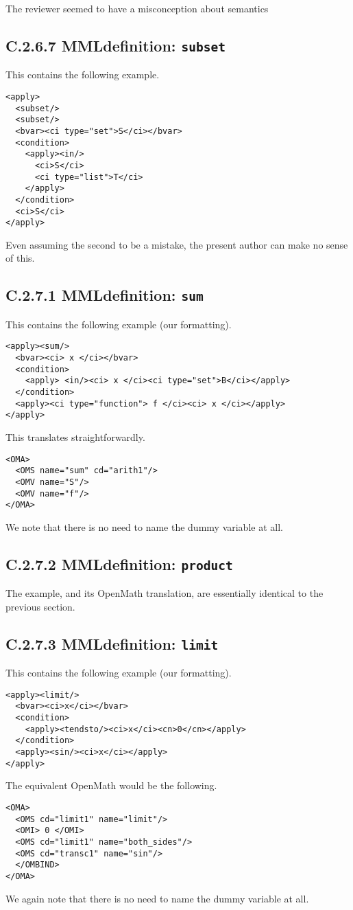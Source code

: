 \documentclass{llncs}
\begin{document}
\begin{newpart}{The reviewer seemed to have a misconception about semantics}
\subsection{C.2.6.7 MMLdefinition: {\tt subset}}\label{C267}
This contains the following example.
\begin{lstlisting}[language=MathML2]
<apply>
  <subset/>
  <subset/>
  <bvar><ci type="set">S</ci></bvar>
  <condition>
    <apply><in/>
      <ci>S</ci>
      <ci type="list">T</ci>
    </apply>
  </condition>
  <ci>S</ci>
</apply>
\end{lstlisting}
Even assuming the second {} to be a mistake, the present author
can make no sense of this.
\subsection{C.2.7.1 MMLdefinition: {\tt sum}}\label{C271}
This contains the following example (our formatting).
\begin{lstlisting}[language=MathML2]
<apply><sum/>
  <bvar><ci> x </ci></bvar>
  <condition>
    <apply> <in/><ci> x </ci><ci type="set">B</ci></apply>
  </condition>
  <apply><ci type="function"> f </ci><ci> x </ci></apply>
</apply>
\end{lstlisting}
This translates straightforwardly.
\begin{lstlisting}
<OMA>
  <OMS name="sum" cd="arith1"/>
  <OMV name="S"/>
  <OMV name="f"/>
</OMA>
\end{lstlisting}
We note that there is no need to name the dummy variable at all.
\subsection{C.2.7.2 MMLdefinition: {\tt product}}\label{C272}
The example, and its OpenMath translation, are essentially identical to the
previous section.
\subsection{C.2.7.3 MMLdefinition: {\tt limit}}\label{C273}
This contains the following example (our formatting).
\begin{lstlisting}[language=MathML2]
<apply><limit/>
  <bvar><ci>x</ci></bvar>
  <condition>
    <apply><tendsto/><ci>x</ci><cn>0</cn></apply>
  </condition>
  <apply><sin/><ci>x</ci></apply>
</apply>
\end{lstlisting}
The equivalent OpenMath would be the following.
\begin{lstlisting}
<OMA>
  <OMS cd="limit1" name="limit"/>
  <OMI> 0 </OMI>
  <OMS cd="limit1" name="both_sides"/>
  <OMS cd="transc1" name="sin"/>
  </OMBIND>
</OMA>
\end{lstlisting}
We again note that there is no need to name the dummy variable at all.

\end{newpart}
\end{document}
